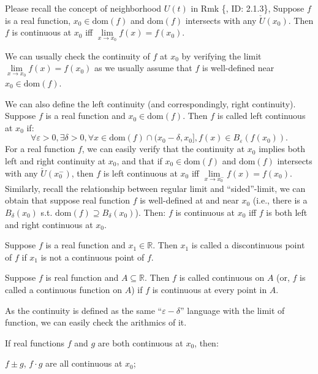 \documentclass{article}
\begin{document}
\begin{Rmk}{}
    \begin{compactenum}
        \item Please recall the concept of neighborhood $U(t)$ in Rmk \{, ID: 2.1.3\}, \textcolor{Th}{Suppose $f$ is a real function, $x_0\in\text{dom}(f)$ and $\text{dom}(f)$ intersects with any $\check{U}(x_0)$. Then $f$ is continuous at $x_0$ iff $\lim\limits_{x\to x_0} f(x) = f(x_0)$.}
        \item We can usually check the continuity of $f$ at $x_0$ by verifying the limit $\lim\limits_{x\to x_0} f(x) = f(x_0)$ as we usually assume that $f$ is well-defined near $x_0\in\text{dom}(f)$.
        \item We can also define the left continuity (and correspondingly, right continuity). \textcolor{Df}{Suppose $f$ is a real function and $x_0\in\text{dom}(f)$. Then $f$ is called left continuous at $x_0$ if:
        $$\forall \varepsilon>0, \exists\delta>0, \forall x\in\text{dom}(f)\cap(x_0-\delta, x_0], f(x)\in B_\varepsilon(f(x_0)).$$} For a real function $f$, we can easily verify that \textcolor{Th}{the continuity at $x_0$ implies both left and right continuity at $x_0$}, and that \textcolor{Th}{if $x_0\in\text{dom}(f)$ and $\text{dom}(f)$ intersects with any $\check{U}(x_0^-)$, then $f$ is left continuous at $x_0$ iff $\lim\limits_{x\to x_0^-} f(x) = f(x_0)$.} Similarly, recall the relationship between regular limit and ``sided''-limit, we can obtain that \textcolor{Th}{suppose real function $f$ is well-defined at and near $x_0$ (i.e., there is a $B_\delta(x_0)$ s.t. $\text{dom}(f)\supseteq B_\delta(x_0)$). Then: $f$ is continuous at $x_0$ iff $f$ is both left and right continuous at $x_0$.}
        \item \textcolor{Df}{Suppose $f$ is a real function and $x_1\in\mathbb{R}$. Then $x_1$ is called a discontinuous point of $f$ if $x_1$ is not a continuous point of $f$.}
        \item \textcolor{Df}{Suppose $f$ is real function and $A\subseteq\mathbb{R}$. Then $f$ is called continuous on $A$ (or, $f$ is called a continuous function on $A$) if $f$ is continuous at every point in $A$.}
        \item As the continuity is defined as the same ``$\varepsilon-\delta$'' language with the limit of function, we can easily check the arithmics of it. \textcolor{Th}{If real functions $f$ and $g$ are both continuous at $x_0$, then: 
        \begin{compactenum}
            \item $f\pm g$, $f\cdot g$ are all continuous at $x_0$;

\end{compactenum}}
\end{compactenum}
\end{Rmk}
\end{document}
